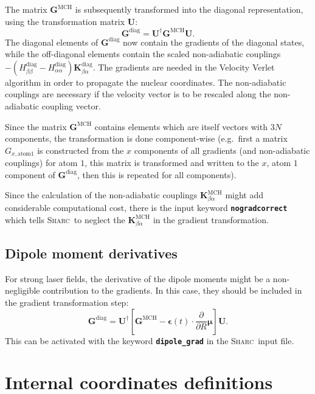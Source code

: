 \documentclass[a4paper,11pt,DIV=15,openany,twoside=false]{scrbook}
\newcommand{\sharc}{\textsc{Sharc}}
\newcommand{\ttt}[1]{\textbf{\texttt{#1}}}
\newcommand{\VEC}[1]{\ensuremath{\mathbf{#1}}}
\begin{document}
The matrix $\VEC{G}^{\text{MCH}}$ is subsequently transformed into the diagonal representation, using the transformation matrix $\VEC{U}$:
\begin{equation}
  \VEC{G}^{\text{diag}}=\VEC{U}^\dagger\VEC{G}^{\text{MCH}}\VEC{U}.
\end{equation}
The diagonal elements of $\VEC{G}^{\text{diag}}$ now contain the gradients of the diagonal states, while the off-diagonal elements contain the scaled non-adiabatic couplings $-(H^{\text{diag}}_{\beta\beta}-H^{\text{diag}}_{\alpha\alpha})\VEC{K}_{\beta\alpha}^{\text{diag}}$. The gradients are needed in the Velocity Verlet algorithm in order to propagate the nuclear coordinates. The non-adiabatic couplings are necessary if the velocity vector is to be rescaled along the non-adiabatic coupling vector.

Since the matrix $\VEC{G}^{\text{MCH}}$ contains elements which are itself vectors with $3N$ components, the transformation is done component-wise (e.g.\ first a matrix $G_{x,\text{atom} 1}$ is constructed from the $x$ components of all gradients (and non-adiabatic couplings) for atom $1$, this matrix is transformed and written to the $x$, atom $1$ component of $\VEC{G}^{\text{diag}}$, then this is repeated for all components).

Since the calculation of the non-adiabatic couplings $\VEC{K}^{\text{MCH}}_{\beta\alpha}$ might add considerable computational cost, there is the input keyword \ttt{nogradcorrect} which tells \sharc\ to neglect the $\VEC{K}^{\text{MCH}}_{\beta\alpha}$ in the gradient transformation.

\subsection{Dipole moment derivatives}\label{met:dipolegrad}

For strong laser fields, the derivative of the dipole moments might be a non-negligible contribution to the gradients. In this case, they should be included in the gradient transformation step:
\begin{equation}
  \VEC{G}^{\text{diag}}=\VEC{U}^\dagger
  \left[
    \VEC{G}^{\text{MCH}}
    -\boldsymbol{\epsilon}(t)\cdot\frac{\partial}{\partial R}\boldsymbol{\mu}
  \right]\VEC{U}.
\end{equation}
This can be activated with the keyword \ttt{dipole\_grad} in the \sharc\ input file.


\section{Internal coordinates definitions}\label{met:geo}
\end{document}
